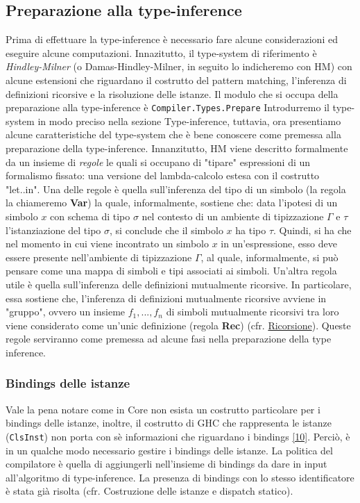 \documentclass[10pt,a4paper]{article}
\begin{document}
\hypertarget{Preparazione alla type-inference}{\subsection{Preparazione alla type-inference}}
Prima di effettuare la type-inference è necessario fare alcune considerazioni ed eseguire alcune computazioni.
Innazitutto, il type-system di riferimento è \textit{Hindley-Milner} (o Damas-Hindley-Milner, in seguito lo indicheremo con HM)
con alcune estensioni che riguardano il costrutto del pattern matching, l'inferenza di definizioni ricorsive e la
risoluzione delle istanze. Il modulo che si occupa della preparazione alla type-inference è \texttt{Compiler.Types.Prepare}
Introdurremo il type-system in modo preciso nella sezione \hypertarget{Type-inference}{Type-inference}, tuttavia, ora
presentiamo alcune
caratteristiche del type-system che è bene conoscere come premessa alla preparazione della type-inference.
Innanzitutto, HM viene descritto formalmente da un insieme di \textit{regole} le quali si occupano di "tipare"
espressioni di un formalismo fissato: una versione del lambda-calcolo estesa con il costrutto "let..in".
Una delle regole è quella sull'inferenza del tipo di un simbolo (la regola la chiameremo \textbf{Var})
la quale, informalmente, sostiene che: data l'ipotesi di un simbolo $ x $ con schema di tipo $ \sigma $ nel contesto di
un ambiente di tipizzazione $ \Gamma $ e $ \tau $ l'istanziazione del tipo $ \sigma $, si conclude che il simbolo
$ x $ ha tipo $ \tau $. Quindi, si ha che nel momento in cui viene incontrato un simbolo $ x $ in un'espressione, esso deve
essere presente nell'ambiente di tipizzazione $ \Gamma $, al quale, informalmente, si può pensare come una mappa di
simboli e tipi associati ai simboli.
Un'altra regola utile è quella
sull'inferenza delle definizioni mutualmente ricorsive. In particolare, essa sostiene che, l'inferenza di definizioni
mutualmente ricorsive avviene in "gruppo", ovvero un insieme $ {f_1, ..., f_n} $ di simboli mutualmente ricorsivi
tra loro viene considerato come un'unic definizione (regola \textbf{Rec}) (cfr. \hyperlink{Ricorsione}{Ricorsione}).
Queste regole serviranno come premessa ad alcune fasi nella preparazione della type inference.

\hypertarget{Bindings delle istanze}{\subsubsection{Bindings delle istanze}}
Vale la pena notare come in Core non esista un costrutto particolare per i bindings delle istanze, inoltre, il
costrutto di GHC che rappresenta le istanze (\texttt{ClsInst}) non porta con sè informazioni che riguardano i
bindings \hyperlink{bibl10}{[10]}.
Perciò, è in un qualche modo necessario gestire i bindings delle istanze. La politica del compilatore è quella di
aggiungerli nell'insieme di bindings da dare in input all'algoritmo di type-inference. La presenza di bindings con lo
stesso identificatore è stata già risolta (cfr. Costruzione delle istanze e dispatch statico).
\end{document}
